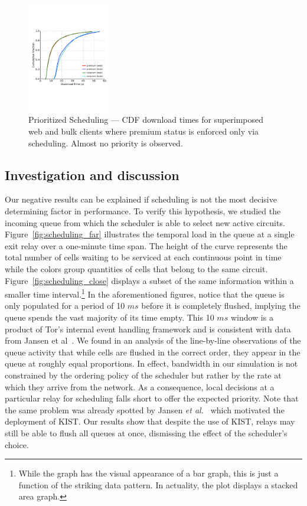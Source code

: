 \begin{figure} \centering
  \includegraphics[trim={0 3cm 0 3cm}, clip,
    width=0.32\textwidth]{images/scheduling_priority.pdf}
  \caption[Prioritized Scheduling]{Prioritized Scheduling --- CDF download times
    for superimposed web and bulk clients where premium status is enforced only
    via scheduling. Almost no priority is observed.}
  \label{fig:scheduling_priority}
\end{figure}

\subsection{Investigation and discussion}

Our negative results can be explained if scheduling is not the most decisive determining factor in performance.
To verify this hypothesis, we studied the incoming queue from which the scheduler is able to select new active circuits.
Figure~\ref{fig:scheduling_far} illustrates the temporal load in the queue at a single exit relay over a one-minute time span.
The height of the curve represents the total number of cells waiting to be serviced at each continuous point in time while the colors group quantities of cells that belong to the same circuit.
Figure~\ref{fig:scheduling_close} displays a subset of the same information within a smaller time interval.\footnote{While the graph has the visual appearance of a bar graph, this is just a function of the striking data pattern.
In actuality, the plot displays a stacked area graph.}
In the aforementioned figures, notice that the queue is only populated for a period of 10 $ms$ before it is completely flushed, implying the queue spends the vast majority of its time empty.
This 10 $ms$ window is a product of Tor's internal event handling framework and is consistent with data from Jansen et al~\cite{jansen2018kist}.
We found in an analysis of the line-by-line observations of the queue activity that while cells are flushed in the correct order, they appear in the queue at roughly equal proportions.
In effect, bandwidth in our simulation is not constrained by the ordering policy of the scheduler but rather by the rate at which they arrive from the network.
As a consequence, local decisions at a particular relay for scheduling falls short to offer the expected priority.
Note that the same problem was already spotted by Jansen \textit{et al.}~\cite{jansen2018kist} which motivated the deployment of KIST.
Our results show that despite the use of KIST, relays may still be able to flush all queues at once, dismissing the effect of the scheduler's choice.


